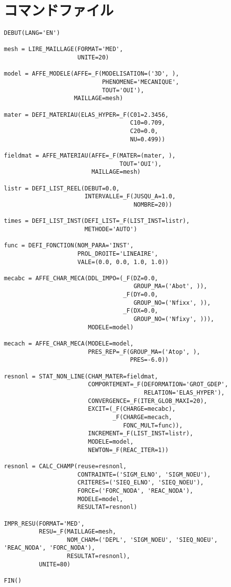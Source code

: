 \section{コマンドファイル}
\begin{lstlisting}[caption =コマンドファイル, label=コマンドファイル]
DEBUT(LANG='EN')

mesh = LIRE_MAILLAGE(FORMAT='MED',
                     UNITE=20)

model = AFFE_MODELE(AFFE=_F(MODELISATION=('3D', ),
                            PHENOMENE='MECANIQUE',
                            TOUT='OUI'),
                    MAILLAGE=mesh)

mater = DEFI_MATERIAU(ELAS_HYPER=_F(C01=2.3456,
                                    C10=0.709,
                                    C20=0.0,
                                    NU=0.499))

fieldmat = AFFE_MATERIAU(AFFE=_F(MATER=(mater, ),
                                 TOUT='OUI'),
                         MAILLAGE=mesh)

listr = DEFI_LIST_REEL(DEBUT=0.0,
                       INTERVALLE=_F(JUSQU_A=1.0,
                                     NOMBRE=20))

times = DEFI_LIST_INST(DEFI_LIST=_F(LIST_INST=listr),
                       METHODE='AUTO')

func = DEFI_FONCTION(NOM_PARA='INST',
                     PROL_DROITE='LINEAIRE',
                     VALE=(0.0, 0.0, 1.0, 1.0))

mecabc = AFFE_CHAR_MECA(DDL_IMPO=(_F(DZ=0.0,
                                     GROUP_MA=('Abot', )),
                                  _F(DY=0.0,
                                     GROUP_NO=('Nfixx', )),
                                  _F(DX=0.0,
                                     GROUP_NO=('Nfixy', ))),
                        MODELE=model)

mecach = AFFE_CHAR_MECA(MODELE=model,
                        PRES_REP=_F(GROUP_MA=('Atop', ),
                                    PRES=-6.0))

resnonl = STAT_NON_LINE(CHAM_MATER=fieldmat,
                        COMPORTEMENT=_F(DEFORMATION='GROT_GDEP',
                                        RELATION='ELAS_HYPER'),
                        CONVERGENCE=_F(ITER_GLOB_MAXI=20),
                        EXCIT=(_F(CHARGE=mecabc),
                               _F(CHARGE=mecach,
                                  FONC_MULT=func)),
                        INCREMENT=_F(LIST_INST=listr),
                        MODELE=model,
                        NEWTON=_F(REAC_ITER=1))

resnonl = CALC_CHAMP(reuse=resnonl,
                     CONTRAINTE=('SIGM_ELNO', 'SIGM_NOEU'),
                     CRITERES=('SIEQ_ELNO', 'SIEQ_NOEU'),
                     FORCE=('FORC_NODA', 'REAC_NODA'),
                     MODELE=model,
                     RESULTAT=resnonl)

IMPR_RESU(FORMAT='MED',
          RESU=_F(MAILLAGE=mesh,
                  NOM_CHAM=('DEPL', 'SIGM_NOEU', 'SIEQ_NOEU', 'REAC_NODA', 'FORC_NODA'),
                  RESULTAT=resnonl),
          UNITE=80)

FIN()
\end{lstlisting}